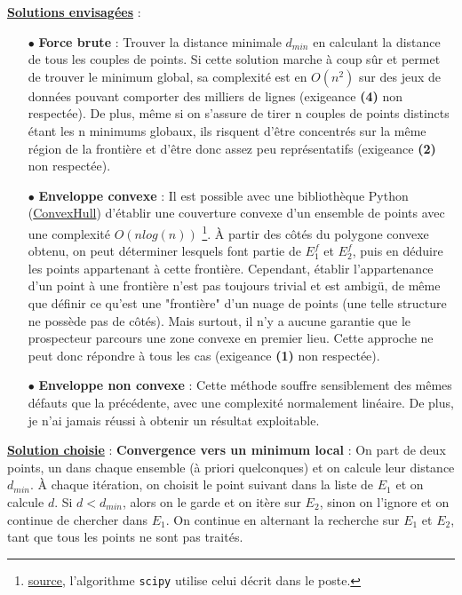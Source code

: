 \documentclass[12pt]{article}
\begin{document}
    \noindent\textbf{\underline{Solutions envisagées}} :
    \begin{enumerate}
        \item[$\bullet$] \textbf{Force brute} : Trouver la distance minimale $d_{min}$ en calculant la distance de tous les couples de points. Si cette solution marche à coup sûr et permet de trouver le minimum global, sa complexité est en $O(n^{2})$ sur des jeux de données pouvant comporter des milliers de lignes (exigeance \textbf{(4)} non respectée). De plus, même si on s'assure de tirer n couples de points distincts étant les n minimums globaux, ils risquent d'être concentrés sur la même région de la frontière et d'être donc assez peu représentatifs (exigeance \textbf{(2)} non respectée).
        \item[$\bullet$] \textbf{Enveloppe convexe} : Il est possible avec une bibliothèque Python (\href{https://docs.scipy.org/doc/scipy/reference/generated/scipy.spatial.ConvexHull.html}{ConvexHull}) d'établir une couverture convexe d'un ensemble de points avec une complexité $O(nlog(n))$ \footnote{\href{https://stackoverflow.com/questions/13524344/complexity-of-the-quickhull-algorithm}{source}, l'algorithme \texttt{scipy} utilise celui décrit dans le poste.}. À partir des côtés du polygone convexe obtenu, on peut déterminer lesquels font partie de $E_1^f$ et $E_2^f$, puis en déduire les points appartenant à cette frontière. Cependant, établir l'appartenance d'un point à une frontière n'est pas toujours trivial et est ambigü, de même que définir ce qu'est une "frontière" d'un nuage de points (une telle structure ne possède pas de côtés). Mais surtout, il n'y a aucune garantie que le prospecteur parcours une zone convexe en premier lieu. Cette approche ne peut donc répondre à tous les cas (exigeance \textbf{(1)} non respectée).
        \item[$\bullet$] \textbf{Enveloppe non convexe} : Cette méthode souffre sensiblement des mêmes défauts que la précédente, avec une complexité normalement linéaire. De plus, je n'ai jamais réussi à obtenir un résultat exploitable.
    \end{enumerate}
    \textbf{\underline{Solution choisie}} : \textbf{Convergence vers un minimum local} : On part de deux points, un dans chaque ensemble (à priori quelconques) et on calcule leur distance $d_{min}$. À chaque itération, on choisit le point suivant dans la liste de $E_1$ et on calcule $d$. Si $d < d_{min}$, alors on le garde et on itère sur $E_2$, sinon on l'ignore et on continue de chercher dans $E_1$. On continue en alternant la recherche sur $E_1$ et $E_2$, tant que tous les points ne sont pas traités. 
    
\end{document}
